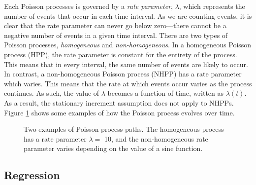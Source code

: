 \documentclass[a4paper,11pt]{article}
\begin{document}
   Each Poisson processes is governed by a \emph{rate parameter}, $\lambda$,
   which represents the number of events that occur in each time interval. As we
   are counting events, it is clear that the rate parameter can never go below
   zero---there cannot be a negative number of events in a given time
   interval. There are two types of Poisson processes, \emph{homogeneous} and
   \emph{non-homogeneous}. In a homogeneous Poisson process (HPP), the rate
   parameter is constant for the entirety of the process. This means that in
   every interval, the same number of events are likely to occur. In contrast, a
   non-homogeneous Poisson process (NHPP) has a rate parameter which
   varies. This means that the rate at which events occur varies as the process
   continues. As such, the value of $\lambda$ becomes a function of time,
   written as $\lambda(t)$. As a result, the stationary increment assumption
   does not apply to NHPPs. Figure \ref{fig:poisson} shows some examples of how
   the Poisson process evolves over time.
   \begin{figure}
   \caption{Two examples of Poisson process paths. The homogeneous process has a
   rate parameter $\lambda=$ 10, and the non-homogeneous rate parameter varies
   depending on the value of a sine function.}
   \label{fig:poisson}
   \end{figure}
\subsection{Regression}
\label{sec-2-3}
\end{document}
